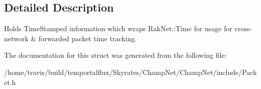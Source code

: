 \subsection{Detailed Description}
Holds Time\-Stamped information which wraps Rak\-Net\-::\-Time for usage for cross-\/network \& forwarded packet time tracking. 

The documentation for this struct was generated from the following file\-:\begin{DoxyCompactItemize}
\item 
/home/travis/build/temportalflux/\-Skyrates/\-Champ\-Net/\-Champ\-Net/include/Packet.\-h\end{DoxyCompactItemize}

